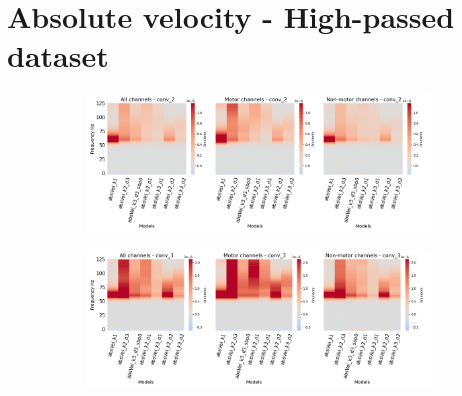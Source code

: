 \section*{Absolute velocity - High-passed dataset}\label{subsec:absVel-high-passed-dataset-appendixA}
\begin{figure}[!htb]
\centering
\begin{subfigure}[a]{\textwidth}
   \includegraphics[width=0.9\linewidth]{img/appendix/A/conv-2/hp-m/absVel-model-gradients_all_kinds}
   \caption{}
   \label{fig:absVel-hp-grads-conv-2}
\end{subfigure}

\begin{subfigure}[b]{\textwidth}
   \includegraphics[width=0.9\linewidth]{img/appendix/A/conv-3/hp-m/absVel-model-gradients_all_kinds}
   \caption{}
   \label{fig:absVel-hp-grads-conv-3}
\end{subfigure}
\end{figure}
\clearpage   

